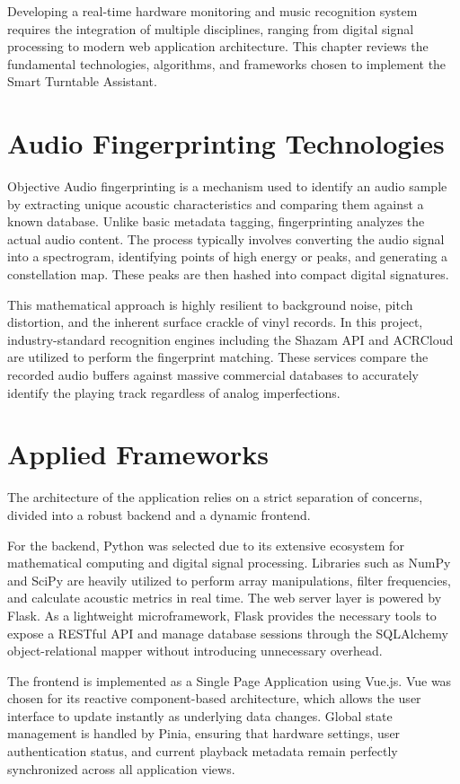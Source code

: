 \documentclass[12pt,a4paper,english]{report}
\begin{document}
Developing a real-time hardware monitoring and music recognition system requires the integration of multiple disciplines, ranging from digital signal processing to modern web application architecture. This chapter reviews the fundamental technologies, algorithms, and frameworks chosen to implement the Smart Turntable Assistant.

\section{Audio Fingerprinting Technologies}
Objective
Audio fingerprinting is a mechanism used to identify an audio sample by extracting unique acoustic characteristics and comparing them against a known database. Unlike basic metadata tagging, fingerprinting analyzes the actual audio content. The process typically involves converting the audio signal into a spectrogram, identifying points of high energy or peaks, and generating a constellation map. These peaks are then hashed into compact digital signatures.

This mathematical approach is highly resilient to background noise, pitch distortion, and the inherent surface crackle of vinyl records. In this project, industry-standard recognition engines including the Shazam API and ACRCloud are utilized to perform the fingerprint matching. These services compare the recorded audio buffers against massive commercial databases to accurately identify the playing track regardless of analog imperfections.

\section{Applied Frameworks}

The architecture of the application relies on a strict separation of concerns, divided into a robust backend and a dynamic frontend. 

For the backend, Python was selected due to its extensive ecosystem for mathematical computing and digital signal processing. Libraries such as NumPy and SciPy are heavily utilized to perform array manipulations, filter frequencies, and calculate acoustic metrics in real time. The web server layer is powered by Flask. As a lightweight microframework, Flask provides the necessary tools to expose a RESTful API and manage database sessions through the SQLAlchemy object-relational mapper without introducing unnecessary overhead.

The frontend is implemented as a Single Page Application using Vue.js. Vue was chosen for its reactive component-based architecture, which allows the user interface to update instantly as underlying data changes. Global state management is handled by Pinia, ensuring that hardware settings, user authentication status, and current playback metadata remain perfectly synchronized across all application views.
\end{document}
